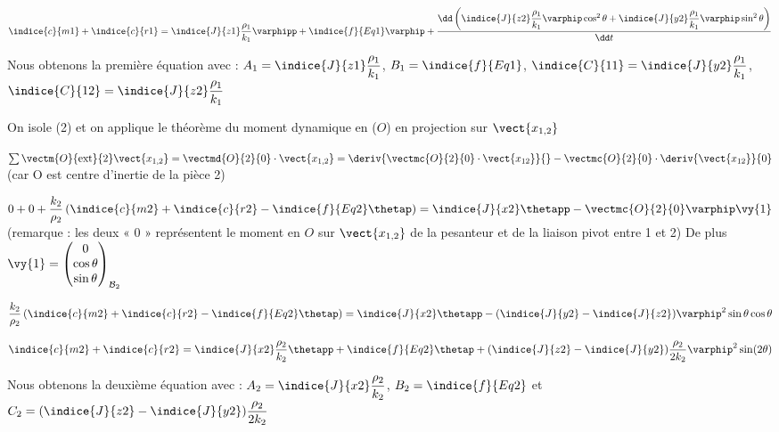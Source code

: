 \begin{corrige}
$\indice{c}{m1}  +\indice{c}{r1}  =\indice{J}{z1}\dfrac{\rho_1}{k_1}\varphipp+\indice{f}{Eq1} \varphip+\dfrac{\dd \left(
\indice{J}{z2}\dfrac{\rho_1}{k_1}\varphip \cos^2 \theta+\indice{J}{y2}\dfrac{\rho_1}{k_1}\varphip \sin^2 \theta \right)}{\dd t}$

Nous obtenons la première équation avec : $A_1=\indice{J}{z1}\dfrac{\rho_1}{k_1}$, $B_1=\indice{f}{Eq1}$, $\indice{C}{11}=\indice{J}{y2}\dfrac{\rho_1}{k_1}$, $\indice{C}{12}=\indice{J}{z2}\dfrac{\rho_1}{k_1}$  

\vspace{1cm}

On isole (2) et on applique le théorème du moment dynamique en ($O$) en projection sur $\vect{x_{1,2}}$

$\sum \vectm{O}{\text{ext}}{2} \vect{x_{1,2}}  = \vectmd{O}{2}{0} \cdot \vect{x_{1,2}} = \deriv{\vectmc{O}{2}{0}\cdot \vect{x_{12}}}{} - \vectmc{O}{2}{0}\cdot\deriv{\vect{x_{12}}}{0}$ (car O est centre d’inertie de la pièce 2)

$0+0+\dfrac{k_2}{\rho_2}\left(\indice{c}{m2}+\indice{c}{r2}-\indice{f}{Eq2}\thetap\right)=\indice{J}{x2}  \thetapp - 
\vectmc{O}{2}{0} \varphip \vy{1}$ (remarque : les deux « 0 » représentent le moment en $O$ sur $\vect{x_{1,2}}$ de la pesanteur et de la liaison pivot entre 1 et 2) De plus $\vy{1}=\begin{pmatrix} 0 \\ \cos\theta \\ \sin \theta \end{pmatrix}_{\mathcal{B}_2}$

$\dfrac{k_2}{\rho_2}\left(\indice{c}{m2}+\indice{c}{r2}-\indice{f}{Eq2}\thetap \right)=\indice{J}{x2} \thetapp-(\indice{J}{y2}-\indice{J}{z2} )   \varphip^2   \sin  \theta  \cos  \theta$

$\indice{c}{m2}+\indice{c}{r2}=\indice{J}{x2}\dfrac{\rho_2}{k_2} \thetapp+\indice{f}{Eq2}\thetap+(\indice{J}{z2}-\indice{J}{y2 })\dfrac{ \rho_2}{2  k_2}\varphip^2   \sin ( 2  \theta)$

Nous obtenons la deuxième équation avec : 
$A_2=\indice{J}{x2}  \dfrac{\rho_2}{k_2}$, $B_2=\indice{f}{Eq2}$ et $C_2=(\indice{J}{z2}-\indice{J}{y2})\dfrac{\rho_2}{2 k_2}$

\end{corrige}
\else
\fi



